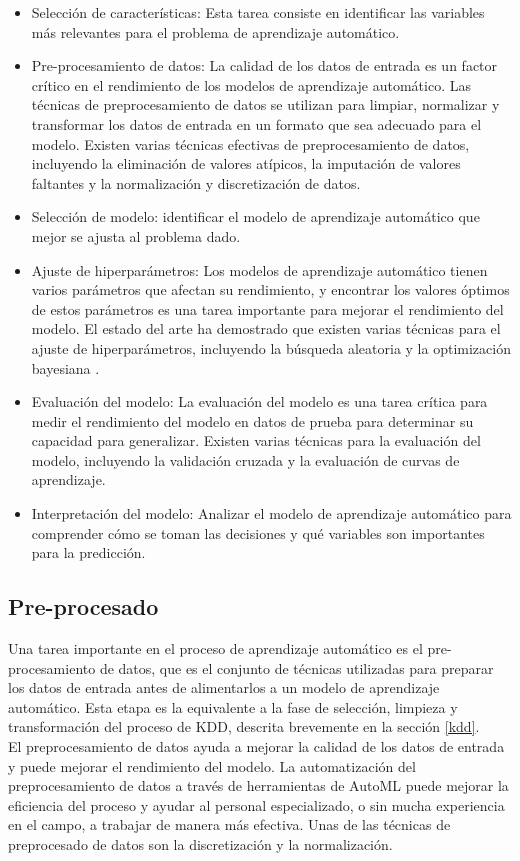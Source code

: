 \begin{itemize}
	\item Selección de características: Esta tarea consiste en identificar las variables más relevantes para el problema de aprendizaje automático. 
	\item Pre-procesamiento de datos: La calidad de los datos de entrada es un factor crítico en el rendimiento de los modelos de aprendizaje automático. Las técnicas de preprocesamiento de datos se utilizan para limpiar, normalizar y transformar los datos de entrada en un formato que sea adecuado para el modelo. Existen varias técnicas efectivas de preprocesamiento de datos, incluyendo la eliminación de valores atípicos, la imputación de valores faltantes y la normalización y discretización de datos.
	\item Selección de modelo: identificar el modelo de aprendizaje automático que mejor se ajusta al problema dado.
	\item Ajuste de hiperparámetros: Los modelos de aprendizaje automático tienen varios parámetros que afectan su rendimiento, y encontrar los valores óptimos de estos parámetros es una tarea importante para mejorar el rendimiento del modelo. El estado del arte ha demostrado que existen varias técnicas para el ajuste de hiperparámetros, incluyendo la búsqueda aleatoria \citep{zoller2021benchmark} y la optimización bayesiana \citep{he2021automl} \cite{hutter2019automated}.
	\item Evaluación del modelo: La evaluación del modelo es una tarea crítica para medir el rendimiento del modelo en datos de prueba para determinar su capacidad para generalizar. Existen varias técnicas para la evaluación del modelo, incluyendo la validación cruzada y la evaluación de curvas de aprendizaje.
	\item Interpretación del modelo: Analizar el modelo de aprendizaje automático para comprender cómo se toman las decisiones y qué variables son importantes para la predicción.
\end{itemize}

\subsection{Pre-procesado}
Una tarea importante en el proceso de aprendizaje automático es el pre-procesamiento de datos, que es el conjunto de técnicas utilizadas para preparar los datos de entrada antes de alimentarlos a un modelo de aprendizaje automático. Esta etapa es la equivalente a la fase de selección, limpieza y transformación del proceso de KDD, descrita brevemente en la sección \ref{kdd}. \\
El preprocesamiento de datos ayuda a mejorar la calidad de los datos de entrada y puede mejorar el rendimiento del modelo. La automatización del preprocesamiento de datos a través de herramientas de AutoML puede mejorar la eficiencia del proceso y ayudar al personal especializado, o sin mucha experiencia en el campo, a trabajar de manera más efectiva. Unas de las técnicas de preprocesado de datos son la discretización y la normalización.

